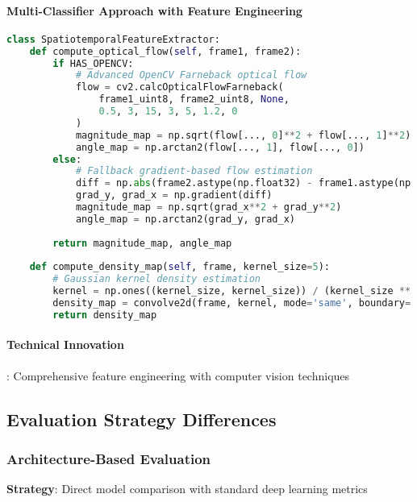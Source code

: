\documentclass[11pt,a4paper]{article}
\begin{document}
\paragraph{Multi-Classifier Approach with Feature Engineering}
\begin{lstlisting}[language=Python, caption=Feature-Based Technical Implementation]
class SpatiotemporalFeatureExtractor:
    def compute_optical_flow(self, frame1, frame2):
        if HAS_OPENCV:
            # Advanced OpenCV Farneback optical flow
            flow = cv2.calcOpticalFlowFarneback(
                frame1_uint8, frame2_uint8, None, 
                0.5, 3, 15, 3, 5, 1.2, 0
            )
            magnitude_map = np.sqrt(flow[..., 0]**2 + flow[..., 1]**2)
            angle_map = np.arctan2(flow[..., 1], flow[..., 0])
        else:
            # Fallback gradient-based flow estimation
            diff = np.abs(frame2.astype(np.float32) - frame1.astype(np.float32))
            grad_y, grad_x = np.gradient(diff)
            magnitude_map = np.sqrt(grad_x**2 + grad_y**2)
            angle_map = np.arctan2(grad_y, grad_x)
        
        return magnitude_map, angle_map
    
    def compute_density_map(self, frame, kernel_size=5):
        # Gaussian kernel density estimation
        kernel = np.ones((kernel_size, kernel_size)) / (kernel_size ** 2)
        density_map = convolve2d(frame, kernel, mode='same', boundary='symm')
        return density_map
\end{lstlisting}

\paragraph{Technical Innovation}: Comprehensive feature engineering with computer vision techniques

\subsection{Evaluation Strategy Differences}

\subsubsection{Architecture-Based Evaluation}
\textbf{Strategy}: Direct model comparison with standard deep learning metrics
\end{document}
